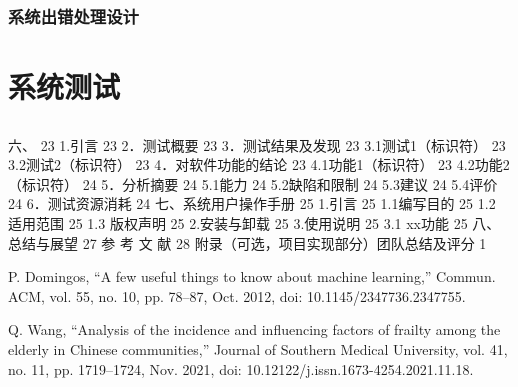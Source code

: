 \documentclass{base}
\begin{document}
\subsubsection{系统出错处理设计}


\section{系统测试}

\subsection{}
\subsection{}
\subsection{}
\subsection{}
\subsection{}
\subsection{}

六、	23
1.引言	23
2．测试概要	23
3．测试结果及发现	23
3.1测试1（标识符）	23
3.2测试2（标识符）	23
4．对软件功能的结论	23
4.1功能1（标识符）	23
4.2功能2（标识符）	24
5．分析摘要	24
5.1能力	24
5.2缺陷和限制	24
5.3建议	24
5.4评价	24
6．测试资源消耗	24
七、系统用户操作手册	25
1.引言	25
1.1编写目的	25
1.2 适用范围	25
1.3 版权声明	25
2.安装与卸载	25
3.使用说明	25
3.1 xx功能	25
八、总结与展望	27
参 考 文 献	28
附录（可选，项目实现部分）团队总结及评分	1




\noindent[1] P. Domingos, “A few useful things to know about machine learning,” Commun. ACM, vol. 55, no. 10, pp. 78–87, Oct. 2012, doi: 10.1145/2347736.2347755.

\noindent[2] Q. Wang, “Analysis of the incidence and influencing factors of frailty among the elderly in Chinese communities,” Journal of Southern Medical University, vol. 41, no. 11, pp. 1719–1724, Nov. 2021, doi: 10.12122/j.issn.1673-4254.2021.11.18.
\end{document}

